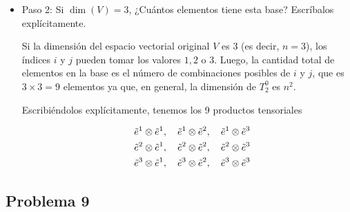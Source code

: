 \documentclass[11pt,spanish]{article}
\begin{document}
\begin{itemize}
\item Paso 2: Si $\dim(V)=3$, ¿Cuántos elementos tiene esta base? Escríbalos explícitamente.

Si la dimensión del espacio vectorial original $V$ es $3$ (es decir, $n=3$), los índices $i$ y $j$ pueden tomar los valores $1, 2$ o $3$.
Luego, la cantidad total de elementos en la base es el número de combinaciones posibles de $i$ y $j$, que es $3 \times 3 = 9$ elementos ya que, en general, la dimensión de $T_2^0$ es $n^2$.

Escribiéndolos explícitamente, tenemos los 9 productos tensoriales

\begin{eqnarray}
&&
\tilde{e}^1 \otimes \tilde{e}^1, \quad \tilde{e}^1 \otimes \tilde{e}^2, \quad \tilde{e}^1 \otimes \tilde{e}^3 \\ \notag
&&
\tilde{e}^2 \otimes \tilde{e}^1, \quad \tilde{e}^2 \otimes \tilde{e}^2, \quad \tilde{e}^2 \otimes \tilde{e}^3 \\ \notag
&&
\tilde{e}^3 \otimes \tilde{e}^1, \quad \tilde{e}^3 \otimes \tilde{e}^2, \quad \tilde{e}^3 \otimes \tilde{e}^3 \notag
\end{eqnarray}

\end{itemize}

\subsection*{Problema 9}
\end{document}
